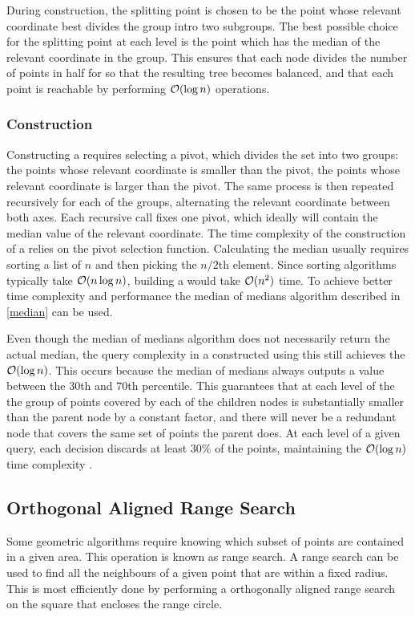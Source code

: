 During construction, the splitting point is chosen to be the point whose relevant coordinate best divides the group intro two subgroups. The best possible choice for the splitting point at each level is the point which has the median of the relevant coordinate in the group. This ensures that each node divides the number of points in half for so that the resulting tree becomes balanced, and that each point is reachable by performing $\mathcal{O}(\log{n})$ operations.


\subsubsection*{Construction}
Constructing a \kdtree requires selecting a pivot, which divides the set into two groups: the points whose relevant coordinate is smaller than the pivot, the points whose relevant coordinate is larger than the pivot. The same process is then repeated recursively for each of the groups, alternating the relevant coordinate between both axes. Each recursive call fixes one pivot, which ideally will contain the median value of the relevant coordinate. The time complexity of the construction of a \kdtree relies on the pivot selection function. Calculating the median usually requires sorting a list of $n$ and then picking the $n/2$th element. Since sorting algorithms typically take $\mathcal{O}(n \log{n})$, building a \kdtree would take $\mathcal{O}(n^2)$ time. To achieve better time complexity and performance the median of medians algorithm described in \ref{median} can be used.

Even though the median of medians algorithm does not necessarily return the actual median, the query complexity in a \kdtree constructed using this still achieves the $\mathcal{O}(\log{n})$. This occurs because the median of medians always outputs a value between the $30$th and $70$th percentile. This guarantees that at each level of the \kdtree the group of points covered by each of the children nodes is substantially smaller than the parent node by a constant factor, and there will never be a redundant node that covers the same set of points the parent does. At each level of a given query, each decision discards at least 30\% of the points, maintaining the $\mathcal{O}(\log{n})$ time complexity \cite{kdmedian}.

\subsection{Orthogonal Aligned Range Search}
Some geometric algorithms require knowing which subset of points are contained in a given area. This operation is known as range search. A range search can be used to find all the neighbours of a given point that are within a fixed radius. This is most efficiently done by performing a orthogonally aligned range search on the square that encloses the range circle.

